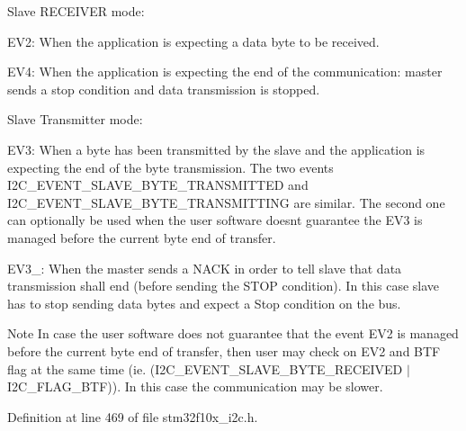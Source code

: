 \begin{DoxyItemize}
\item Slave R\+E\+C\+E\+I\+V\+ER mode\+:
\begin{DoxyItemize}
\item E\+V2\+: When the application is expecting a data byte to be received.
\item E\+V4\+: When the application is expecting the end of the communication\+: master sends a stop condition and data transmission is stopped.
\end{DoxyItemize}
\item Slave Transmitter mode\+:
\begin{DoxyItemize}
\item E\+V3\+: When a byte has been transmitted by the slave and the application is expecting the end of the byte transmission. The two events I2\+C\+\_\+\+E\+V\+E\+N\+T\+\_\+\+S\+L\+A\+V\+E\+\_\+\+B\+Y\+T\+E\+\_\+\+T\+R\+A\+N\+S\+M\+I\+T\+T\+ED and I2\+C\+\_\+\+E\+V\+E\+N\+T\+\_\+\+S\+L\+A\+V\+E\+\_\+\+B\+Y\+T\+E\+\_\+\+T\+R\+A\+N\+S\+M\+I\+T\+T\+I\+NG are similar. The second one can optionally be used when the user software doesn\textquotesingle{}t guarantee the E\+V3 is managed before the current byte end of transfer.
\item E\+V3\+\_\+: When the master sends a N\+A\+CK in order to tell slave that data transmission shall end (before sending the S\+T\+OP condition). In this case slave has to stop sending data bytes and expect a Stop condition on the bus.
\end{DoxyItemize}

\begin{DoxyNote}{Note}
In case the user software does not guarantee that the event E\+V2 is managed before the current byte end of transfer, then user may check on E\+V2 and B\+TF flag at the same time (ie. (I2\+C\+\_\+\+E\+V\+E\+N\+T\+\_\+\+S\+L\+A\+V\+E\+\_\+\+B\+Y\+T\+E\+\_\+\+R\+E\+C\+E\+I\+V\+ED $\vert$ I2\+C\+\_\+\+F\+L\+A\+G\+\_\+\+B\+TF)). In this case the communication may be slower. 
\end{DoxyNote}

\end{DoxyItemize}

Definition at line 469 of file stm32f10x\+\_\+i2c.\+h.

\mbox{\label{group___i2_c___events_ga50652880323b8c2746b5afbdfea03fe1}} 
